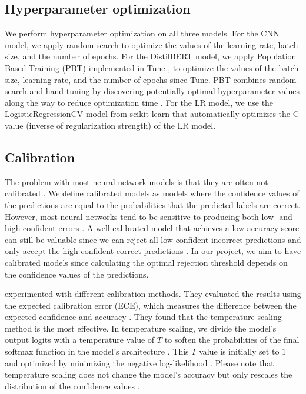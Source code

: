 \subsection{Hyperparameter optimization}
We perform hyperparameter optimization on all three models.
%
For the CNN model, we apply random search to optimize the values of the learning rate, batch size, and the number of epochs.
%
For the DistilBERT model, we apply Population Based Training (PBT) \citep{jaderberg2017population} implemented in Tune \citep{liaw2018tune}, to optimize the values of the batch size, learning rate, and the number of epochs since Tune.
%
PBT combines random search and hand tuning by discovering potentially optimal hyperparameter values along the way to reduce optimization time \citep{jaderberg2017population}.
%
For the LR model, we use the LogisticRegressionCV model from scikit-learn that automatically optimizes the C value (inverse of regularization strength) of the LR model.

\subsection{Calibration}
The problem with most neural network models is that they are often not calibrated \citep{guo2017calibration,sayin2021science}.
%
We define calibrated models as models where the confidence values of the predictions are equal to the probabilities that the predicted labels are correct.
%
However, most neural networks tend to be sensitive to producing both low- and high-confident errors \citep{guo2017calibration, sayin2021science}.
%
A well-calibrated model that achieves a low accuracy score can still be valuable since we can reject all low-confident incorrect predictions and only accept the high-confident correct predictions \citep{sayin2021science}.
%
In our project, we aim to have calibrated models since calculating the optimal rejection threshold depends on the confidence values of the predictions.
%

%
\citet{guo2017calibration} experimented with different calibration methods.
%
They evaluated the results using the expected calibration error (ECE), which measures the difference between the expected confidence and accuracy \citep{guo2017calibration}.
%
They found that the temperature scaling method is the most effective.
%
In temperature scaling, we divide the model's output logits with a temperature value of $T$ to soften the probabilities of the final softmax function in the model's architecture \citep{guo2017calibration}.
%
This $T$ value is initially set to $1$ and optimized by minimizing the negative log-likelihood \citep{guo2017calibration}.
%
Please note that temperature scaling does not change the model's accuracy but only rescales the distribution of the confidence values \citep{guo2017calibration}.
%


